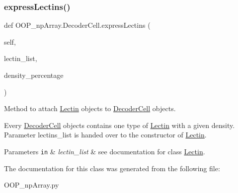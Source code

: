 \subsubsection{\texorpdfstring{express\+Lectins()}{expressLectins()}}
{\footnotesize\ttfamily def O\+O\+P\+\_\+np\+Array.\+Decoder\+Cell.\+express\+Lectins (\begin{DoxyParamCaption}\item[{}]{self,  }\item[{}]{lectin\+\_\+list,  }\item[{}]{density\+\_\+percentage }\end{DoxyParamCaption})}



Method to attach \mbox{\hyperlink{class_o_o_p__np_array_1_1_lectin}{Lectin}} objects to \mbox{\hyperlink{class_o_o_p__np_array_1_1_decoder_cell}{Decoder\+Cell}} objects. 

Every \mbox{\hyperlink{class_o_o_p__np_array_1_1_decoder_cell}{Decoder\+Cell}} objects contains one type of \mbox{\hyperlink{class_o_o_p__np_array_1_1_lectin}{Lectin}} with a given density. Parameter lectins\+\_\+list is handed over to the constructor of \mbox{\hyperlink{class_o_o_p__np_array_1_1_lectin}{Lectin}}.


\begin{DoxyParams}[1]{Parameters}
\mbox{\tt in}  & {\em lectin\+\_\+list} & see documentation for class \mbox{\hyperlink{class_o_o_p__np_array_1_1_lectin}{Lectin}}. \\
\hline
\end{DoxyParams}


The documentation for this class was generated from the following file\+:\begin{DoxyCompactItemize}
\item 
O\+O\+P\+\_\+np\+Array.\+py\end{DoxyCompactItemize}
